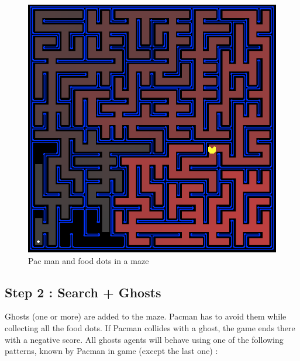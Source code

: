 \documentclass[12pt,a4paper,BCOR12mm, headexclude, footexclude, twoside, openright]{scrartcl}
\numberwithin{equation}{section} %
\numberwithin{figure}{section} %
\numberwithin{table}{section} %
\begin{document}
\begin{figure}
	\label{fullmaze}
	\begin{center}
	
	\includegraphics[scale=0.5]{pacmazefull.png}
    \caption{Pac man and food dots in a maze}
    \end{center}
\end{figure}





\subsection{Step 2 : Search + Ghosts}

Ghosts (one or more) are added to the maze. Pacman has to avoid them while collecting all the food dots. If Pacman collides with a ghost, the game ends there with a negative score. All ghosts agents will behave using one of the following patterns, known by Pacman in game (except the last one) :
\end{document}
